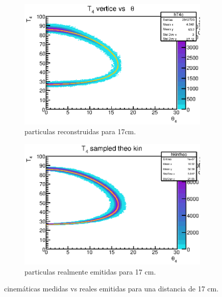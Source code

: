 \documentclass[12pt,a4paper]{article}
\numberwithin{equation}{section}
\numberwithin{figure}{section}
\begin{document}
\begin{figure}[h!] \centering
    \begin{subfigure}[b]{0.45\linewidth} \centering
        \includegraphics[scale=0.8]{17_measured_kin.eps}
        \caption{particulas reconstruidas para 17cm.}
        \label{Fig:2.3.02-measured-17}
    \end{subfigure}
    \begin{subfigure}[b]{0.45\linewidth} \centering
        \includegraphics[scale=0.8]{17_simulation_kin.eps}
        \caption{particulas realmente emitidas para 17 cm.}
        \label{Fig:2.3.02-theo-17}
    \end{subfigure}
    \caption{cinemáticas medidas vs reales emitidas para una distancia de 17 cm.}
\end{figure}
    
\end{document}
